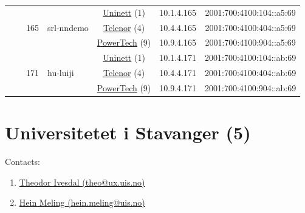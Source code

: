 \begin{small}
\begin{center}
\begin{longtable}{|c|c|c|c|c|c|c|c|}
  &  & \multirow{3}{*}{\tiny{165}} & \multicolumn{1}{|l|}{\multirow{3}{*}{\tiny{srl-nndemo}}} & \multicolumn{2}{|c|}{\tiny{\href{https://www.uninett.no}{Uninett} (1)}} & \tiny{10.1.4.165} & \tiny{2001:700:4100:104::a5:69} \\* \cline{5-5}\cline{6-6}\cline{7-7}\cline{8-8}
  &  &  &  & \multicolumn{2}{|c|}{\tiny{\href{https://www.telenor.no}{Telenor} (4)}} & \tiny{10.4.4.165} & \tiny{2001:700:4100:404::a5:69} \\* \cline{5-5}\cline{6-6}\cline{7-7}\cline{8-8}
  &  &  &  & \multicolumn{2}{|c|}{\tiny{\href{http://www.powertech.no}{PowerTech} (9)}} & \tiny{10.9.4.165} & \tiny{2001:700:4100:904::a5:69} \\* \cline{3-3}\cline{4-4}\cline{5-5}\cline{6-6}\cline{7-7}\cline{8-8}
  &  & \multirow{3}{*}{\tiny{171}} & \multicolumn{1}{|l|}{\multirow{3}{*}{\tiny{hu-luiji}}} & \multicolumn{2}{|c|}{\tiny{\href{https://www.uninett.no}{Uninett} (1)}} & \tiny{10.1.4.171} & \tiny{2001:700:4100:104::ab:69} \\* \cline{5-5}\cline{6-6}\cline{7-7}\cline{8-8}
  &  &  &  & \multicolumn{2}{|c|}{\tiny{\href{https://www.telenor.no}{Telenor} (4)}} & \tiny{10.4.4.171} & \tiny{2001:700:4100:404::ab:69} \\* \cline{5-5}\cline{6-6}\cline{7-7}\cline{8-8}
  &  &  &  & \multicolumn{2}{|c|}{\tiny{\href{http://www.powertech.no}{PowerTech} (9)}} & \tiny{10.9.4.171} & \tiny{2001:700:4100:904::ab:69} \\ \hline
\end{longtable}
\end{center}
\end{small}



\section{Universitetet i Stavanger (5)}
\label{sec:UiS}

Contacts:
\begin{enumerate}
 \item {}\href{mailto:theo@ux.uis.no}{Theodor Ivesdal (theo@ux.uis.no)}
 \item {}\href{mailto:hein.meling@uis.no}{Hein Meling (hein.meling@uis.no)}
\end{enumerate}

